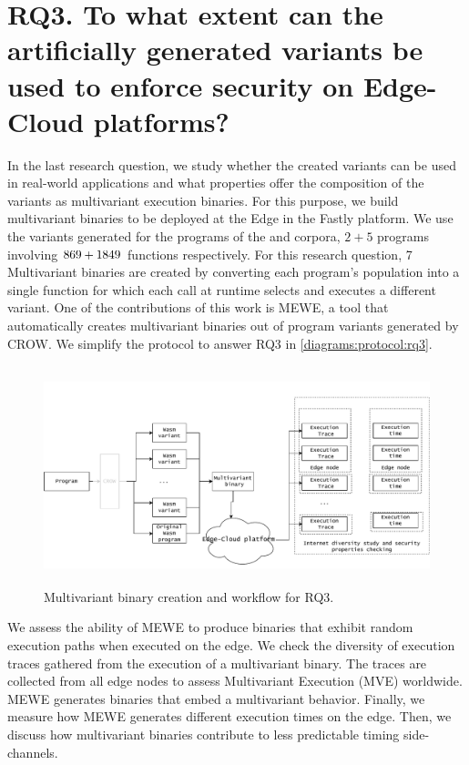 
\section{RQ3. To what extent can the artificially generated variants be used to enforce security on Edge-Cloud platforms?}

\newcommand{\mewe}{MEWE\xspace}



In the last research question, we study whether the created variants can be used in real-world applications and what properties offer the composition of the variants as multivariant execution binaries. For this purpose, we build multivariant binaries to be deployed at the Edge in the Fastly platform. We use the variants generated for the programs of the \corpussodium and \corpusqrcode corpora, $2 + 5$ programs involving $ 869 + 1849$ functions respectively. For this research question, 7 Multivariant binaries are created by converting each program's population into a single function for which each call at runtime selects and executes a different variant. One of the contributions of this work is \mewe, a tool that automatically creates multivariant binaries out of program variants generated by CROW. We simplify the protocol to answer RQ3 in \autoref{diagrams:protocol:rq3}.



\begin{figure}[h]
    \centering
    \includegraphics[height=2.50in]{diagrams/Rq3.pdf}
    \caption{Multivariant binary creation and workflow for RQ3.}
    \label{diagrams:protocol:rq3}
\end{figure}

We assess the ability of \mewe to produce binaries that exhibit random execution paths when executed on the edge. We check the diversity of execution traces gathered from the execution of a multivariant binary. The traces are collected from all edge nodes to assess Multivariant Execution (MVE) worldwide. \mewe generates binaries that embed a multivariant behavior. Finally, we measure how \mewe generates different execution times on the edge. Then, we discuss how multivariant binaries contribute to less predictable timing side-channels.

